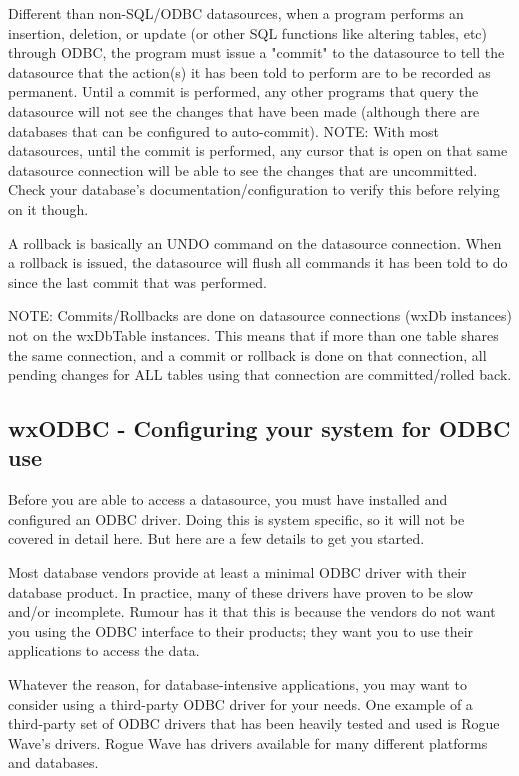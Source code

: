 Different than non-SQL/ODBC datasources, when a program performs an 
insertion, deletion, or update (or other SQL functions like altering 
tables, etc) through ODBC, the program must issue a "commit" to the 
datasource to tell the datasource that the action(s) it has been told to 
perform are to be recorded as permanent. Until a commit is performed, 
any other programs that query the datasource will not see the changes that 
have been made (although there are databases that can be configured to 
auto-commit). NOTE: With most datasources, until the commit is 
performed, any cursor that is open on that same datasource connection 
will be able to see the changes that are uncommitted. Check your 
database's documentation/configuration to verify this before relying on it 
though.

A rollback is basically an UNDO command on the datasource connection. When 
a rollback is issued, the datasource will flush all commands it has been told 
to do since the last commit that was performed.

NOTE: Commits/Rollbacks are done on datasource connections (wxDb instances) 
not on the wxDbTable instances. This means that if more than one table 
shares the same connection, and a commit or rollback is done on that 
connection, all pending changes for ALL tables using that connection are 
committed/rolled back.

\subsection{wxODBC - Configuring your system for ODBC use}\label{wxodbcconfiguringyoursystem}

Before you are able to access a datasource, you must have installed and 
configured an ODBC driver. Doing this is system specific, so it will not be 
covered in detail here. But here are a few details to get you started.

Most database vendors provide at least a minimal ODBC driver with their 
database product. In practice, many of these drivers have proven to be slow 
and/or incomplete. Rumour has it that this is because the vendors do not want 
you using the ODBC interface to their products; they want you to use their 
applications to access the data. 

Whatever the reason, for database-intensive applications, you may want to 
consider using a third-party ODBC driver for your needs. One example of a 
third-party set of ODBC drivers that has been heavily tested and used is 
Rogue Wave's drivers. Rogue Wave has drivers available for many different 
platforms and databases.
 
